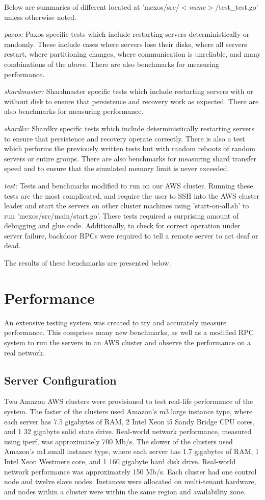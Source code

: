\documentclass[letterpaper,10pt]{article}
\begin{document}
Below are summaries of different located at 'mexos/src/\emph{$<$name$>$}/test\_test.go' unless otherwise noted.

\emph{paxos:} Paxos specific tests which include restarting servers deterministically or randomly.  These include cases where servers lose their disks, where all servers restart, where partitioning changes, where communication is unreliable, and many combinations of the above.  There are also benchmarks for measuring performance.

\emph{shardmaster:} Shardmaster specific tests which include restarting servers with or without disk to ensure that persistence and recovery work as expected.  There are also benchmarks for measuring performance.

\emph{shardkv:} Shardkv specific tests which include deterministically restarting servers to ensure that persistence and recovery operate correctly.  There is also a test which performs the previously written tests but with random reboots of random servers or entire groups.  There are also benchmarks for measuring shard transfer speed and to ensure that the simulated memory limit is never exceeded.

\emph{test:} Tests and benchmarks modified to run on our AWS cluster.  Running these tests are the most complicated, and require the user to SSH into the AWS cluster leader and start the servers on other cluster machines using 'start-on-all.sh' to run 'mexos/src/main/start.go'. These tests required a surprising amount of debugging and glue code.  Additionally, to check for correct operation under server failure, backdoor RPCs were required to tell a remote server to act deaf or dead.

The results of these benchmarks are presented below.

\section{Performance}

An extensive testing system was created to try and accurately measure performance.  This comprises many new benchmarks, as well as a modified RPC system to run the servers in an AWS cluster and observe the performance on a real network.

\subsection{Server Configuration}
Two Amazon AWS clusters were provisioned to test real-life performance of the system. The faster of the clusters used Amazon's m3.large instance type, where each server has 7.5 gigabytes of RAM, 2 Intel Xeon i5 Sandy Bridge CPU cores, and 1 32 gigabyte solid state drive. Real-world network performance, measured using iperf, was approximately 700 Mb/s. The slower of the clusters used Amazon's m1.small instance type, where each server has 1.7 gigabytes of RAM, 1 Intel Xeon Westmere core, and 1 160 gigabyte hard disk drive. Real-world network performance was approximately 150 Mb/s. Each cluster had one control node and twelve slave nodes. Instances were allocated on multi-tenant hardware, and nodes within a cluster were within the same region and availability zone.
\end{document}
